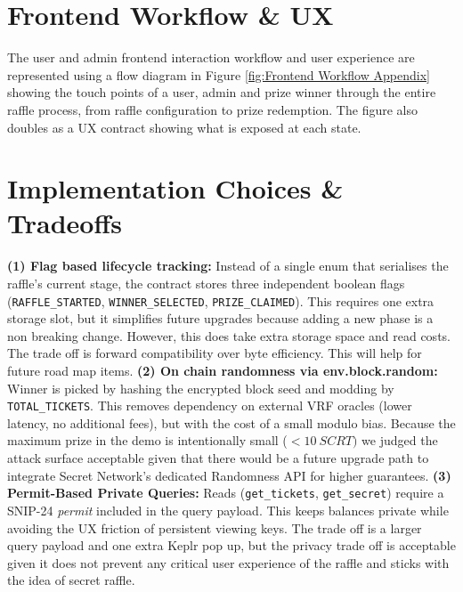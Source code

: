 \documentclass[8pt]{extarticle}
\begin{document}
\section{Frontend Workflow \& UX}
The user and admin frontend interaction workflow and user experience are represented using a flow diagram in Figure \ref{fig:Frontend Workflow Appendix} showing the touch points of a user, admin and prize winner through the entire raffle process, from raffle configuration to prize redemption. The figure also doubles as a UX contract showing what is exposed at each state.

\section{Implementation Choices \& Tradeoffs}

\textbf{(1) Flag based lifecycle tracking:} Instead of a single enum that serialises the raffle's current stage, the contract stores three independent boolean flags (\texttt{RAFFLE\_STARTED}, \texttt{WINNER\_SELECTED}, \texttt{PRIZE\_CLAIMED}). This requires one extra storage slot, but it simplifies future upgrades because adding a new phase is a non breaking change. However, this does take extra storage space and read costs. The trade off is forward compatibility over byte efficiency. This will help for future road map items. \textbf{(2) On chain randomness via env.block.random:} Winner is picked by hashing the encrypted block seed and modding by \texttt{TOTAL\_TICKETS}. This removes dependency on external VRF oracles (lower latency, no additional fees), but with the cost of a small modulo bias. Because the maximum prize in the demo is intentionally small (\(<10~SCRT)\) we judged the attack surface acceptable given that there would be a future upgrade path to integrate Secret Network's dedicated Randomness API for higher guarantees. \textbf{(3) Permit-Based Private Queries:} Reads (\texttt{get\_tickets}, \texttt{get\_secret}) require a SNIP-24 \emph{permit} included in the query payload. This keeps balances private while avoiding the UX friction of persistent viewing keys. The trade off is a larger query payload and one extra Keplr pop up, but the privacy trade off is acceptable given it does not prevent any critical user experience of the raffle and sticks with the idea of secret raffle.
\end{document}
